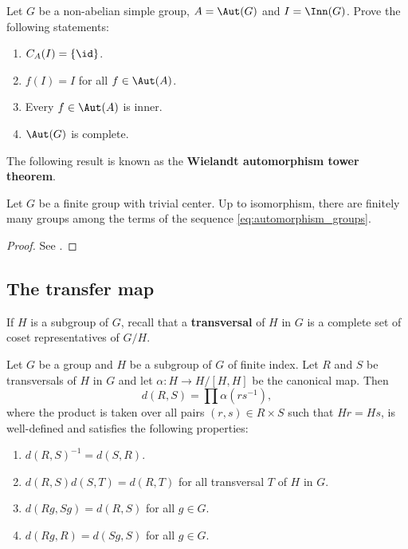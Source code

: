 \begin{exercise}
\label{xca:Aut}
    Let $G$ be a non-abelian simple group, $A=\Aut(G)$ and
    $I=\Inn(G)$. Prove the following statements:
    \begin{enumerate}
        \item $C_A(I)=\{\id\}$. 
        \item $f(I)=I$ for all $f\in \Aut(A)$.
        \item Every $f\in\Aut(A)$ is inner. 
        \item $\Aut(G)$ is complete. 
    \end{enumerate}    
\end{exercise}


The following result is known as the \textbf{Wielandt automorphism tower theorem}. 

\begin{theorem}[Wielandt]
    \label{thm:Wielandt:automorphism}
    Let $G$ be a finite group with trivial center. Up to isomorphism, there
    are finitely many groups among the terms of the sequence \eqref{eq:automorphism_groups}.  
\end{theorem}

\begin{proof}
    See \cite[Theorem 9.10]{MR2426855}.
\end{proof}

\subsection{The transfer map}

If $H$ is a subgroup of $G$, recall that 
a \textbf{transversal} of $H$ in $G$ is a complete
set of coset representatives of $G/H$. 

\begin{lemma}
	\label{lem:d:transfer}
	Let $G$ be a group and $H$ be a subgroup of $G$ of finite index.  Let $R$
	and $S$ be transversals of $H$ in $G$ and let $\alpha\colon H\to H/[H,H]$
	be the canonical map. Then 
	\[
		d(R,S)=\prod \alpha(rs^{-1}),
	\]
	where the product is taken over all pairs 
	$(r,s)\in R\times S$ such that $Hr=Hs$,
	is well-defined and satisfies the following properties:
	\begin{enumerate}
		\item $d(R,S)^{-1}=d(S,R)$.
		\item $d(R,S)d(S,T)=d(R,T)$ for all transversal $T$ of $H$ in $G$.
		\item $d(Rg,Sg)=d(R,S)$ for all $g\in G$.
		\item $d(Rg,R)=d(Sg,S)$ for all $g\in G$.
	\end{enumerate}
\end{lemma}

